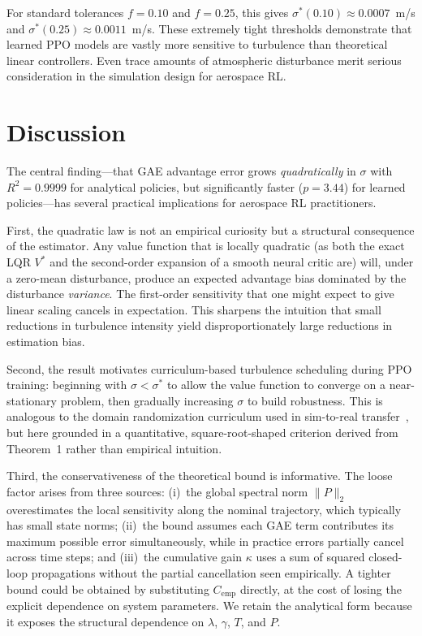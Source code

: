 \documentclass[10pt, conference]{IEEEtran}
\begin{document}
For standard tolerances $f = 0.10$ and $f = 0.25$, this gives
$\sigma^*(0.10) \approx 0.0007$~m/s and $\sigma^*(0.25) \approx 0.0011$~m/s.
These extremely tight thresholds demonstrate that learned PPO models are
vastly more sensitive to turbulence than theoretical linear controllers.
Even trace amounts of atmospheric disturbance merit serious consideration in
the simulation design for aerospace RL.

\section{Discussion}

The central finding---that GAE advantage error grows \emph{quadratically}
in $\sigma$ with $R^2 = 0.9999$ for analytical policies, but significantly
faster ($p=3.44$) for learned policies---has several practical implications for
aerospace RL practitioners.

First, the quadratic law is not an empirical curiosity but a structural
consequence of the estimator. Any value function that is locally
quadratic (as both the exact LQR $V^*$ and the second-order expansion of
a smooth neural critic are) will, under a zero-mean disturbance, produce
an expected advantage bias dominated by the disturbance \emph{variance}.
The first-order sensitivity that one might expect to give linear scaling
cancels in expectation. This sharpens the intuition that small reductions
in turbulence intensity yield disproportionately large reductions in
estimation bias.

Second, the result motivates curriculum-based turbulence scheduling
during PPO training: beginning with $\sigma < \sigma^*$ to allow the
value function to converge on a near-stationary problem, then gradually
increasing $\sigma$ to build robustness. This is analogous to the domain
randomization curriculum used in sim-to-real transfer~\cite{tobin2017},
but here grounded in a quantitative, square-root-shaped criterion derived
from Theorem~1 rather than empirical intuition.

Third, the conservativeness of the theoretical bound 
is informative. The loose
factor arises from three sources: (i)~the global spectral norm $\|P\|_2$
overestimates the local sensitivity along the nominal trajectory, which
typically has small state norms; (ii)~the bound assumes each GAE term
contributes its maximum possible error simultaneously, while in practice
errors partially cancel across time steps; and (iii)~the cumulative gain
$\kappa$ uses a sum of squared closed-loop propagations without the
partial cancellation seen empirically. A tighter bound could be obtained
by substituting $C_{\text{emp}}$ directly, at the cost of losing the
explicit dependence on system parameters. We retain the analytical form
because it exposes the structural dependence on $\lambda$, $\gamma$, $T$,
and $P$.
\end{document}
